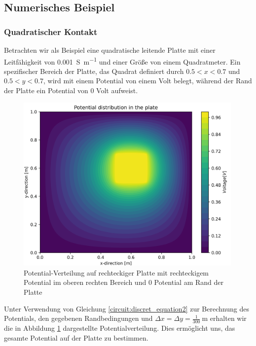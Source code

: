 \subsection{Numerisches Beispiel} 
\subsubsection{Quadratischer Kontakt}
Betrachten wir als Beispiel eine quadratische leitende Platte mit
einer Leitfähigkeit von \SI{0.001}{\siemens\per\meter} und einer
Größe von einem Quadratmeter. Ein spezifischer Bereich der Platte,
das Quadrat definiert durch $0.5 < x < 0.7$ und $0.5 < y < 0.7$,
wird mit einem Potential von einem Volt belegt, während der Rand
der Platte ein Potential von 0 Volt aufweist.

\begin{figure}
	\centering
	\includegraphics[width=0.99\textwidth]{papers/circuit/potential_distribution-resized.png}
	\caption{Potential-Verteilung auf rechteckiger Platte mit rechteckigem Potential im oberen rechten Bereich und 0 Potential am Rand der Platte \cite{github:AndreasFMueller}}
	\label{fig:potential_distribution}
\end{figure}
Unter Verwendung von Gleichung \eqref{circuit:discret_equation2}
zur Berechnung des Potentials, den gegebenen Randbedingungen und
$\Delta x = \Delta y = \frac{1}{300}\SI{}{\meter}$ erhalten wir die
in Abbildung \ref{fig:potential_distribution} dargestellte
Potentialverteilung. Dies ermöglicht uns, das gesamte Potential auf
der Platte zu bestimmen.

